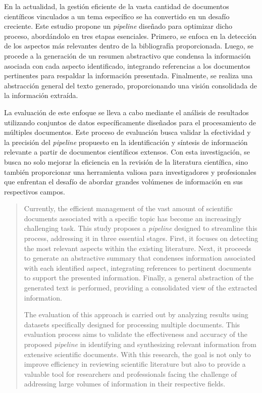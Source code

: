 \begin{resumen}
	En la actualidad, la gestión eficiente de la vasta cantidad de documentos científicos vinculados a un tema específico se ha convertido en un desafío creciente. Este estudio propone un \emph{pipeline} diseñado para optimizar dicho proceso, abordándolo en tres etapas esenciales. Primero, se enfoca en la detección de los aspectos más relevantes dentro de la bibliografía proporcionada. Luego, se procede a la generación de un resumen abstractivo que condensa la información asociada con cada aspecto identificado, integrando referencias a los documentos pertinentes para respaldar la información presentada. Finalmente, se realiza una abstracción general del texto generado, proporcionando una visión consolidada de la información extraída.

	La evaluación de este enfoque se lleva a cabo mediante el análisis de resultados utilizando conjuntos de datos específicamente diseñados para el procesamiento de múltiples documentos. Este proceso de evaluación busca validar la efectividad y la precisión del \emph{pipeline} propuesto en la identificación y síntesis de información relevante a partir de documentos científicos extensos. Con esta investigación, se busca no solo mejorar la eficiencia en la revisión de la literatura científica, sino también proporcionar una herramienta valiosa para investigadores y profesionales que enfrentan el desafío de abordar grandes volúmenes de información en sus respectivos campos.
\end{resumen}

\begin{abstract}
	Currently, the efficient management of the vast amount of scientific documents associated with a specific topic has become an increasingly challenging task. This study proposes a \emph{pipeline} designed to streamline this process, addressing it in three essential stages. First, it focuses on detecting the most relevant aspects within the existing literature. Next, it proceeds to generate an abstractive summary that condenses information associated with each identified aspect, integrating references to pertinent documents to support the presented information. Finally, a general abstraction of the generated text is performed, providing a consolidated view of the extracted information.

	The evaluation of this approach is carried out by analyzing results using datasets specifically designed for processing multiple documents. This evaluation process aims to validate the effectiveness and accuracy of the proposed \emph{pipeline} in identifying and synthesizing relevant information from extensive scientific documents. With this research, the goal is not only to improve efficiency in reviewing scientific literature but also to provide a valuable tool for researchers and professionals facing the challenge of addressing large volumes of information in their respective fields.
\end{abstract}